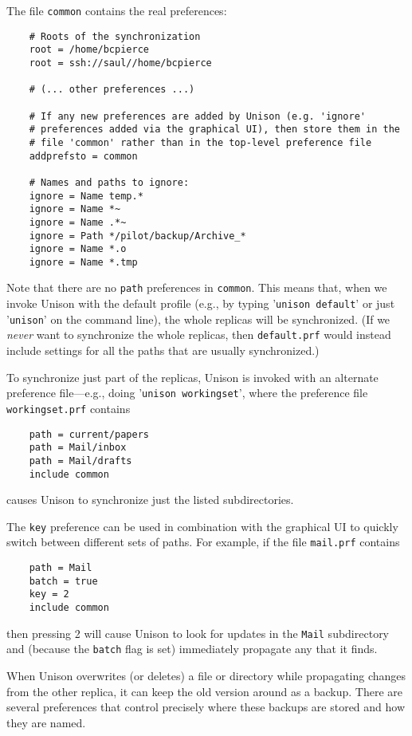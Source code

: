 \documentclass{article}
\begin{document}
The file {\tt common} contains the real preferences:
\begin{verbatim}
    # Roots of the synchronization
    root = /home/bcpierce
    root = ssh://saul//home/bcpierce

    # (... other preferences ...)

    # If any new preferences are added by Unison (e.g. 'ignore'
    # preferences added via the graphical UI), then store them in the
    # file 'common' rather than in the top-level preference file
    addprefsto = common

    # Names and paths to ignore:
    ignore = Name temp.*
    ignore = Name *~
    ignore = Name .*~
    ignore = Path */pilot/backup/Archive_*
    ignore = Name *.o
    ignore = Name *.tmp
\end{verbatim}
Note that there are no {\tt path} preferences in {\tt common}.  This
means that, when we invoke Unison with the default profile (e.g., by
typing '{\tt unison default}' or just '{\tt unison}' on the command
line), the whole replicas will be synchronized.  (If we {\em never} want
to synchronize the whole replicas, then {\tt default.prf} would instead
include settings for all the paths that are usually synchronized.)

To synchronize just part of the replicas, Unison is invoked with an
alternate preference file---e.g., doing '{\tt unison workingset}', where the
preference file {\tt workingset.prf} contains
\begin{verbatim}
    path = current/papers
    path = Mail/inbox
    path = Mail/drafts
    include common
\end{verbatim}
causes Unison to synchronize just the listed subdirectories.

The {\tt key} preference can be used in combination with the graphical UI
to quickly switch between different sets of paths.  For example, if the
file {\tt mail.prf} contains
\begin{verbatim}
    path = Mail
    batch = true
    key = 2
    include common
\end{verbatim}
then pressing 2 will cause Unison to look for updates in the {\tt Mail}
subdirectory and (because the {\tt batch} flag is set) immediately
propagate any that it finds.



When Unison overwrites (or deletes) a file or directory while propagating changes from
the other replica, it can keep the old version around as a backup.  There
are several preferences that control precisely where these backups are
stored and how they are named.
\end{document}
